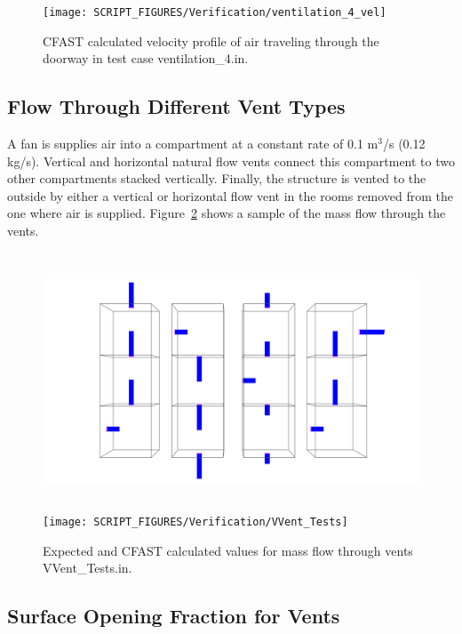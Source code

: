\begin{figure}[!ht]
\centering
\texttt{[image: SCRIPT\_FIGURES/Verification/ventilation\_4\_vel]}
\caption[Results of the test case {\ct ventilation\_4.in}]{CFAST calculated velocity profile of air traveling through the doorway in test case {\ct ventilation\_4.in}.}
\label{fig:vel}
\end{figure}


\subsection{Flow Through Different Vent Types}
\label{VVent_Tests}

A fan is supplies air into a compartment at a constant rate of 0.1 m$^3$/s (0.12 kg/s). Vertical and horizontal natural flow vents connect this compartment to two other compartments stacked vertically.  Finally, the structure is vented to the outside by either a vertical or horizontal flow vent in the rooms removed from the one where air is supplied. Figure~\ref{fig:vvent} shows a sample of the mass flow through the vents.

\begin{figure}
\begin{center}
\includegraphics[height=3.0in]{FIGURES/Verification/VVent_Geom} \\
\texttt{[image: SCRIPT\_FIGURES/Verification/VVent\_Tests]}
\end{center}
\caption[Results of the test case {\ct VVent\_Tests.in}]{Expected and CFAST calculated values for mass flow through vents {\ct VVent\_Tests.in}.}
\label{fig:vvent}
\end{figure}


\subsection{Surface Opening Fraction for Vents}
\label{Surface_Opening_Fraction}

